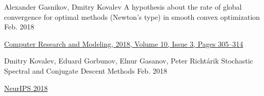 \begin{cventries}
\cventry
{Alexander Gasnikov, Dmitry Kovalev	} %
{A hypothesis about the rate of global convergence for optimal methods (Newton's type) in smooth convex optimization } %
{} %
{Feb. 2018} %
{ %
	\begin{cvitems}
		\item {\href{http://www.mathnet.ru/php/archive.phtml?wshow=paper\&jrnid=crm\&paperid=253\&option\_lang=eng}{
				Computer Research and Modeling, 2018,	Volume 10,	Issue 3,	Pages 305–314}}
	\end{cvitems}
}


\cventry
{Dmitry Kovalev, Eduard Gorbunov, Elnur Gasanov, Peter Richtárik} %
{Stochastic Spectral and Conjugate Descent Methods} %
{} %
{Feb. 2018} %
{ %
\begin{cvitems}
\item {\href{https://papers.nips.cc/paper/7596-stochastic-spectral-and-conjugate-descent-methods}{NeurIPS 2018}}
\end{cvitems}
}



\end{cventries}